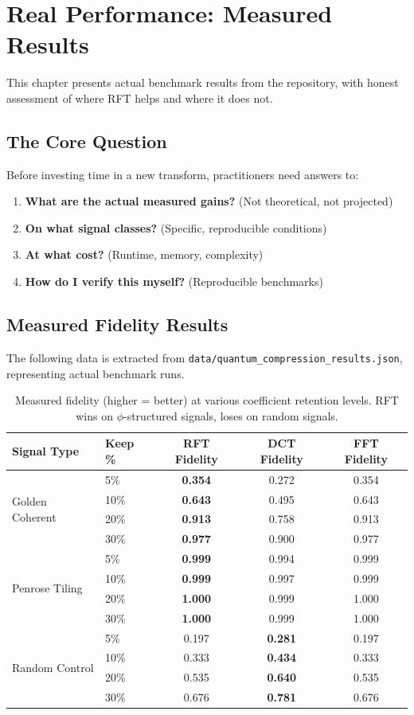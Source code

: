 \documentclass[11pt, a4paper, openany]{book}
\theoremstyle{definition}
\begin{document}
\chapter{Real Performance: Measured Results}

This chapter presents actual benchmark results from the repository, with honest assessment of where RFT helps and where it does not.

\section{The Core Question}
Before investing time in a new transform, practitioners need answers to:
\begin{enumerate}
    \item \textbf{What are the actual measured gains?} (Not theoretical, not projected)
    \item \textbf{On what signal classes?} (Specific, reproducible conditions)
    \item \textbf{At what cost?} (Runtime, memory, complexity)
    \item \textbf{How do I verify this myself?} (Reproducible benchmarks)
\end{enumerate}

\section{Measured Fidelity Results}
The following data is extracted from \texttt{data/quantum\_compression\_results.json}, representing actual benchmark runs.

\begin{table}[h]
\centering
\small
\begin{tabular}{@{}llccc@{}}\toprule
Signal Type & Keep \% & RFT Fidelity & DCT Fidelity & FFT Fidelity \\ \midrule
\multirow{4}{*}{Golden Coherent} & 5\% & \textbf{0.354} & 0.272 & 0.354 \\
 & 10\% & \textbf{0.643} & 0.495 & 0.643 \\
 & 20\% & \textbf{0.913} & 0.758 & 0.913 \\
 & 30\% & \textbf{0.977} & 0.900 & 0.977 \\ \midrule
\multirow{4}{*}{Penrose Tiling} & 5\% & \textbf{0.999} & 0.994 & 0.999 \\
 & 10\% & \textbf{0.999} & 0.997 & 0.999 \\
 & 20\% & \textbf{1.000} & 0.999 & 1.000 \\
 & 30\% & \textbf{1.000} & 0.999 & 1.000 \\ \midrule
\multirow{4}{*}{Random Control} & 5\% & 0.197 & \textbf{0.281} & 0.197 \\
 & 10\% & 0.333 & \textbf{0.434} & 0.333 \\
 & 20\% & 0.535 & \textbf{0.640} & 0.535 \\
 & 30\% & 0.676 & \textbf{0.781} & 0.676 \\ \bottomrule
\end{tabular}
\caption{Measured fidelity (higher = better) at various coefficient retention levels. RFT wins on $\phi$-structured signals, loses on random signals.}
\end{table}
\end{document}
